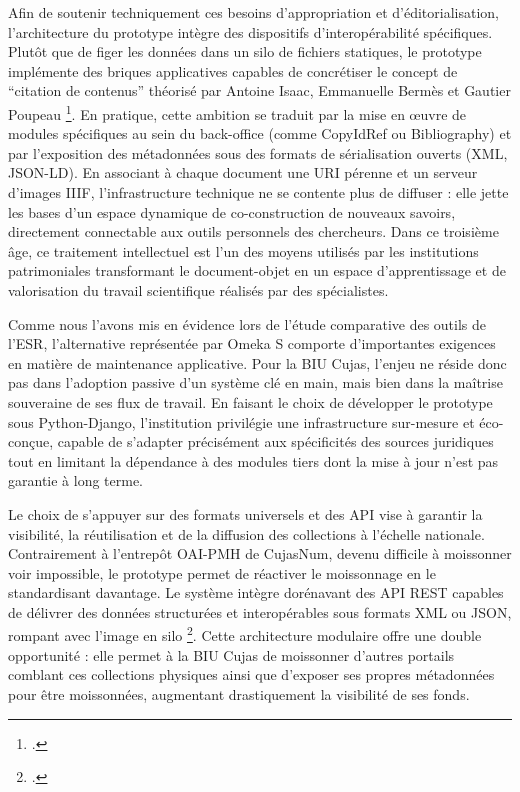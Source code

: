 Afin de soutenir techniquement ces besoins d'appropriation et d'éditorialisation, l'architecture du prototype intègre des dispositifs d'interopérabilité spécifiques. Plutôt que de figer les données dans un silo de fichiers statiques, le prototype implémente des briques applicatives capables de concrétiser le concept de \enquote{citation de contenus} théorisé par Antoine Isaac, Emmanuelle Bermès et Gautier Poupeau \footcite{bermesWebSemantiqueBibliotheque2013}. En pratique, cette ambition se traduit par la mise en œuvre de modules spécifiques au sein du back-office (comme CopyIdRef ou Bibliography) et par l'exposition des métadonnées sous des formats de sérialisation ouverts (\ac{XML}, \ac{JSON-LD}). En associant à chaque document une \ac{URI} pérenne et un serveur d'images \ac{IIIF}, l'infrastructure technique ne se contente plus de diffuser : elle jette les bases d'un espace dynamique de co-construction de nouveaux savoirs, directement connectable aux outils personnels des chercheurs. Dans ce troisième âge, ce traitement intellectuel est l'un des moyens utilisés par les institutions patrimoniales transformant le document-objet en un espace d'apprentissage  et de valorisation du travail scientifique réalisés par des spécialistes.

Comme nous l'avons mis en évidence lors de l'étude comparative des outils de l'ESR, l'alternative représentée par Omeka S comporte d'importantes exigences en matière de maintenance applicative. Pour la \ac{BIU Cujas}, l'enjeu ne réside donc pas dans l'adoption passive d'un système clé en main, mais bien dans la maîtrise souveraine de ses flux de travail. En faisant le choix de développer le prototype sous Python-Django, l'institution privilégie une infrastructure sur-mesure et éco-conçue, capable de s'adapter précisément aux spécificités des sources juridiques tout en limitant la dépendance à des modules tiers dont la mise à jour n'est pas garantie à long terme.

Le choix de s'appuyer sur des formats universels et des \ac{API} vise à garantir la visibilité, la réutilisation et de la diffusion des collections à l'échelle nationale. Contrairement à l'entrepôt \ac{OAI-PMH} de CujasNum, devenu difficile à moissonner voir impossible, le prototype permet de réactiver le moissonnage en le standardisant davantage. Le système intègre dorénavant des \ac{API REST} capables de délivrer des données structurées et interopérables sous formats \ac{XML} ou \ac{JSON}, rompant avec l'image en silo \footnote{.}. Cette architecture modulaire offre une double opportunité : elle permet à la \ac{BIU Cujas} de moissonner d'autres portails comblant ces collections physiques ainsi que d'exposer ses propres métadonnées pour être moissonnées, augmentant drastiquement la visibilité de ses fonds.

